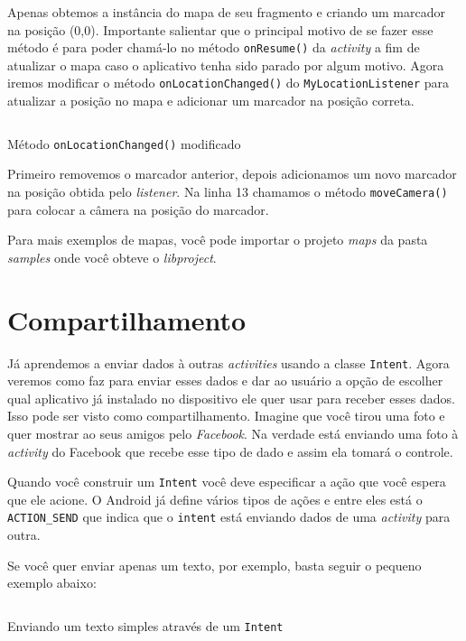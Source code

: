 \documentclass[a4paper,12pt,brazil]{book}
\begin{document}
\begin{singlespace}
		Apenas obtemos a instância do mapa de seu fragmento e criando um marcador na posição (0,0). Importante salientar que o principal motivo de se fazer esse método é para poder chamá-lo no método \texttt{onResume()} da \emph{activity} a fim de atualizar o mapa caso o aplicativo tenha sido parado por algum motivo. Agora iremos modificar o método \texttt{onLocationChanged()} do \texttt{MyLocationListener} para atualizar a posição no mapa e adicionar um marcador na posição correta.
		
		\begin{listing}[H]
		\inputminted[linenos=true,fontsize=\small,frame=lines, framesep=2mm, tabsize=2,numbersep=5pt]{java}{src/api/maps/onlocmod.java}
		\caption{Método \texttt{onLocationChanged()} modificado}
		\label{code:onlocmod}
		\end{listing} 	
		
		Primeiro removemos o marcador anterior, depois adicionamos um novo marcador na posição obtida pelo \emph{listener}. Na linha 13 chamamos o método \texttt{moveCamera()} para colocar a câmera na posição do marcador. 

		Para mais exemplos de mapas, você pode importar o projeto \emph{maps} da pasta \emph{samples} onde você obteve o \emph{libproject}.
	 
	
\chapter{Compartilhamento} 

		Já aprendemos a enviar dados à outras \emph{activities} usando a classe \texttt{Intent}. Agora veremos como faz para enviar esses dados e dar ao usuário a opção de escolher qual aplicativo já instalado no dispositivo ele quer usar para receber esses dados. Isso pode ser visto como compartilhamento. Imagine que você tirou uma foto e quer mostrar ao seus amigos pelo \emph{Facebook}. Na verdade está enviando uma foto à \emph{activity} do Facebook que recebe esse tipo de dado e assim ela tomará o controle.

		Quando você construir um \texttt{Intent} você deve especificar a ação que você espera que ele acione. O Android já define vários tipos de ações e entre eles está o \texttt{ACTION\_SEND} que indica que o \texttt{intent} está enviando dados de uma \emph{activity} para outra. 

		Se você quer enviar apenas um texto, por exemplo, basta seguir o pequeno exemplo abaixo:

		\begin{listing}[H]
		\inputminted[linenos=true,fontsize=\small,frame=lines, framesep=2mm, tabsize=2,numbersep=5pt]{java}{src/api/sharing/simpletext.java}
		\caption{Enviando um texto simples através de um \texttt{Intent}}
		\label{code:simpletext}
		\end{listing} 		


\end{singlespace}
\end{document}

